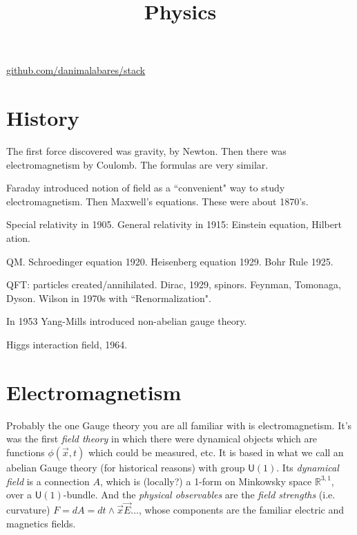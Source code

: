 



\title{Physics}
\maketitle

\label{section-phantom}
\hfill
\href{http://github.com/danimalabares/stack}{github.com/danimalabares/stack}

\tableofcontents

\section{History}
\label{section-history}

The first force discovered was gravity, by Newton. Then there was
electromagnetism by Coulomb. The formulas are very similar.

Faraday introduced notion of field as a ``convenient" way to study
electromagnetism. Then Maxwell's equations. These were about 1870's.

Special relativity in 1905. General relativity in 1915: Einstein equation, Hilbert
ation.

QM. Schroedinger equation 1920. Heisenberg equation 1929. Bohr Rule 1925.

QFT: particles created/annihilated. Dirac, 1929, spinors. Feynman, Tomonaga,
Dyson. Wilson in 1970s with ``Renormalization".

In 1953 Yang-Mills introduced non-abelian gauge theory.

Higgs interaction field, 1964.

\section{Electromagnetism}
\label{section-electromagnetism}

Probably the one Gauge theory you are all familiar with is electromagnetism.
It's was the first \textit{field theory} in which there were dynamical objects
which are functions $\phi(\vec{x},t)$ which could be measured, etc. It is based
in what we call an abelian Gauge theory (for historical reasons) with group
$\mathsf{U}(1)$. Its \textit{dynamical field} is a connection $A$, which is
(locally?) a 1-form on Minkowsky space $\mathbb{R}^{3,1}$, over a
$\mathsf{U}(1)$-bundle. And the \textit{physical observables} are the
\textit{field strengths} (i.e. curvature) $F=dA=dt\wedge \vec{x}
\vec{E}\ldots$, whose components are the familiar electric and
magnetics fields.

